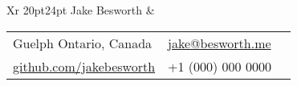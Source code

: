 \documentclass[9pt]{extarticle}
\makeatletter
\newcommand\HUGE{\@setfontsize\Huge{20pt}{24pt}}
\makeatother
\begin{document}
{
    \begin{tabularx}{\textwidth}{Xr}
    {\HUGE\leavevmode\color{em-light} Jake Besworth} &
        \null\hfill\small\begin{tabular}{llX}
            \faMapMarker\space\space\space\color{darkgrey} Guelph Ontario, Canada & \faEnvelope\space\space\color{darkgrey} \href{mailto:jake@besworth.me}{jake@besworth.me} \\[3px]
            \faGithub\space\space\color{darkgrey} \href{https://github.com/jakebesworth}{github.com/jakebesworth} & {\large\faMobilePhone}\space\space\space\color{darkgrey} +1 (000) 000 0000 \\[10px]
        \end{tabular}
    \end{tabularx}

    {\color{lightgrey}{\centerline{\rule{17cm}{0.4pt}}}}
}
\end{document}
